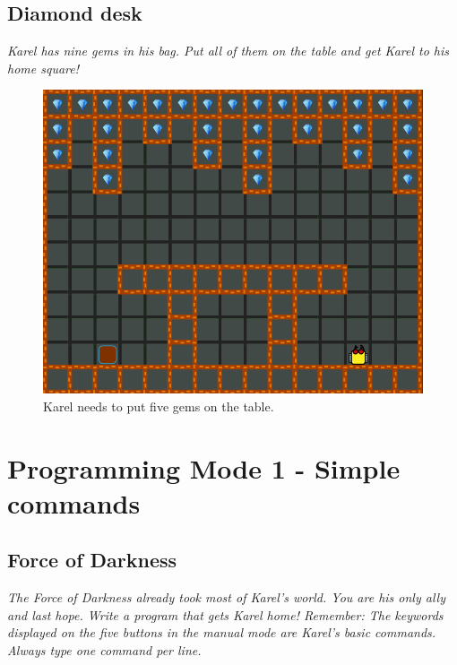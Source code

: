 \subsection{Diamond desk}

{\em Karel has nine gems in his bag. Put all of them on the table and get Karel to his home square!}

\begin{figure}[!ht]
\begin{center}
\includegraphics[height=0.4\textwidth]{img/a13.png}
\end{center}
\vspace{-4mm}
\caption{Karel needs to put five gems on the table.}
\label{fig:a13}
\vspace{-4mm}
\end{figure}
\noindent


\section{Programming Mode 1 - Simple commands}

\subsection{Force of Darkness}

{\em The Force of Darkness already took most of Karel's world. You are his only ally and last hope. Write a program that gets Karel home! Remember: The keywords displayed on the five buttons in the manual mode are Karel's basic commands. Always type one command per line.}\\[-8mm]

